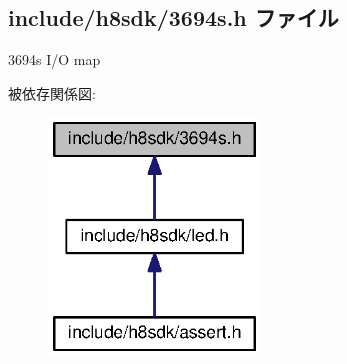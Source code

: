 \subsection{include/h8sdk/3694s.h ファイル}
\label{3694s_8h}


3694s I/\+O map  


被依存関係図\+:
\nopagebreak
\begin{figure}[H]
\begin{center}
\leavevmode
\includegraphics[width=160pt]{d4/dca/3694s_8h__dep__incl}
\end{center}
\end{figure}
